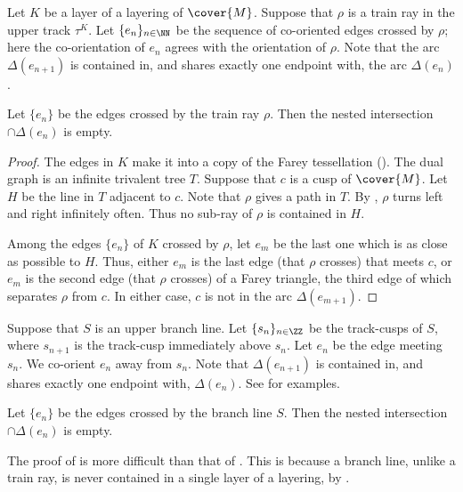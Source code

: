 \documentclass[12pt]{amsart}
\begin{document}
Let $K$ be a layer of a layering of $\cover{M}$.  Suppose that $\rho$ is a train ray in the upper track $\tau^K$.  Let $\{e_n\}_{n \in \NN}$ be the sequence of co-oriented edges crossed by $\rho$; here the co-orientation of $e_n$ agrees with the orientation of $\rho$.  Note that the arc $\Delta(e_{n+1})$ is contained in, and shares exactly one endpoint with, the arc $\Delta(e_n)$.  

\begin{lemma}
\label{Lem:RoutesShrink}
Let $\{e_n\}$ be the edges crossed by the train ray $\rho$.  Then the nested intersection $\cap \Delta(e_n)$ is empty. 
\end{lemma}

\begin{proof}
The edges in $K$ make it into a copy of the Farey tessellation ().  The dual graph is an infinite trivalent tree $T$.  Suppose that $c$ is a cusp of $\cover{M}$.  Let $H$ be the line in $T$ adjacent to $c$.  Note that $\rho$ gives a path in $T$.  By , $\rho$ turns left and right infinitely often.  Thus no sub-ray of $\rho$ is contained in $H$.  


Among the edges $\{e_n\}$ of $K$ crossed by $\rho$, let $e_m$ be the last one which is as close as possible to $H$.  Thus, either $e_m$ is the last edge (that $\rho$ crosses) that meets $c$, or $e_m$ is the second edge (that $\rho$ crosses) of a Farey triangle, the third edge of which separates $\rho$ from $c$.  In either case, $c$ is not in the arc $\Delta(e_{m+1})$.  
\end{proof}

Suppose that $S$ is an upper branch line. Let $\{s_n\}_{n \in \ZZ}$ be the track-cusps of $S$, where $s_{n+1}$ is the track-cusp immediately above $s_n$. Let $e_n$ be the edge meeting $s_n$. We co-orient $e_n$ away from $s_n$. Note that  $\Delta(e_{n+1})$ is contained in, and shares exactly one endpoint with, $\Delta(e_n)$.  See  for examples.  

\begin{lemma}
\label{Lem:BranchLinesShrink}
Let $\{e_n\}$ be the edges crossed by the branch line $S$.  Then the nested intersection $\cap \Delta(e_n)$ is empty. 
\end{lemma}

The proof of  is more difficult than that of .  This is because a branch line, unlike a train ray, is never contained in a single layer of a layering, by .
\end{document}
